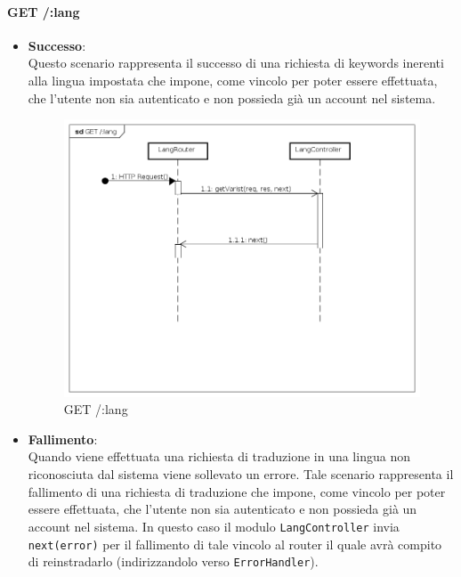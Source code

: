\paragraph{GET /:lang}
\begin{itemize}
\item \textbf{Successo}:\\
Questo scenario rappresenta il successo di una richiesta di keywords inerenti alla lingua impostata che impone, come vincolo per poter essere effettuata, che l'utente non sia autenticato e non possieda già un account nel sistema.  
\label{Procedura di traduzione}
\begin{figure}[ht]
	\centering
	\includegraphics[scale=0.40]{UML/DiagrammiDiSequenza/Back-end/GET_lang_success.png}
	\caption{GET /:lang}
\end{figure}
\FloatBarrier

\item \textbf{Fallimento}:\\
Quando viene effettuata una richiesta di traduzione in una lingua non riconosciuta dal sistema viene sollevato un errore. Tale scenario rappresenta il fallimento di una richiesta di traduzione che impone, come vincolo per poter essere effettuata, che l'utente non sia autenticato e non possieda già un account nel sistema. In questo caso il modulo \texttt{LangController} invia \texttt{next(error)} per il fallimento di tale vincolo al router il quale avrà compito di reinstradarlo (indirizzandolo verso \texttt{ErrorHandler}).
 

\end{itemize}
